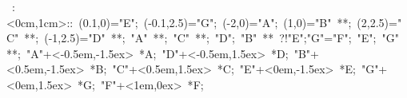 
\hbox{
\xy    <1cm,0cm>:<0cm,1cm>::
       (0.1,0)="E";  (-0.1,2.5)="G";  (-2,0)="A";  (1,0)="B" **\dir{-};
       (2,2.5)="C" **\dir{-};  (-1,2.5)="D" **\dir{-}; "A" **\dir{-};
       "C" **\dir{-};  "D"; "B" **\dir{-} ?!{"E";"G"}="F";
       "E"; "G" **\dir{-};  
       "A"+<-0.5em,-1.5ex> *{A};
       "D"+<-0.5em,1.5ex> *{D};
       "B"+<0.5em,-1.5ex> *{B};
       "C"+<0.5em,1.5ex> *{C};
       "E"+<0em,-1.5ex> *{E};
       "G"+<0em,1.5ex> *{G};       "F"+<1em,0ex> *{F};
       \endxy}
	   
